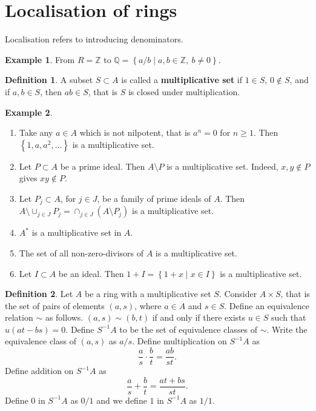 \documentclass{article}
\newcommand{\Z}{\mathbb{Z}}
\newcommand{\Q}{\mathbb{Q}}
\newcommand{\rb}[1]{\left( #1 \right)}
\newcommand{\cb}[1]{\left\{ #1 \right\}}
\theoremstyle{definition}\newtheorem{definition}{Definition}[section]
\theoremstyle{definition}\newtheorem{remark}[definition]{Remark}
\theoremstyle{definition}\newtheorem*{example}{Example}
\theoremstyle{definition}\newtheorem*{note}{Note}
\begin{document}
\section{Localisation of rings}

Localisation refers to introducing denominators.

\begin{example}
From $ R = \Z $ to $ \Q = \cb{a / b \mid a, b \in \Z, \ b \ne 0} $.
\end{example}

\begin{definition}
A subset $ S \subset A $ is called a \textbf{multiplicative set} if $ 1 \in S $, $ 0 \not\in S $, and if $ a, b \in S $, then $ ab \in S $, that is $ S $ is closed under multiplication.
\end{definition}

\begin{example}
\hfill
\begin{enumerate}
\item Take any $ a \in A $ which is not nilpotent, that is $ a^n = 0 $ for $ n \ge 1 $. Then $ \cb{1, a, a^2, \dots} $ is a multiplicative set.
\item Let $ P \subset A $ be a prime ideal. Then $ A \setminus P $ is a multiplicative set. Indeed, $ x, y \notin P $ gives $ xy \notin P $.
\item Let $ P_j \subset A $, for $ j \in J $, be a family of prime ideals of $ A $. Then $ A \setminus \cup_{j \in J} P_j = \cap_{j \in J} \rb{A \setminus P_j} $ is a multiplicative set.
\item $ A^* $ is a multiplicative set in $ A $.
\item The set of all non-zero-divisors of $ A $ is a multiplicative set.
\item Let $ I \subset A $ be an ideal. Then $ 1 + I = \cb{1 + x \mid x \in I} $ is a multiplicative set.
\end{enumerate}
\end{example}

\begin{definition}
Let $ A $ be a ring with a multiplicative set $ S $. Consider $ A \times S $, that is the set of pairs of elements $ \rb{a, s} $, where $ a \in A $ and $ s \in S $. Define an equivalence relation $ \sim $ as follows. $ \rb{a, s} \sim \rb{b, t} $ if and only if there exists $ u \in S $ such that $ u\rb{at - bs} = 0 $. Define $ S^{-1}A $ to be the set of equivalence classes of $ \sim $. Write the equivalence class of $ \rb{a, s} $ as $ a / s $. Define multiplication on $ S^{-1}A $ as
$$ \dfrac{a}{s} \cdot \dfrac{b}{t} = \dfrac{ab}{st}. $$
Define addition on $ S^{-1}A $ as
$$ \dfrac{a}{s} + \dfrac{b}{t} = \dfrac{at + bs}{st}. $$
Define $ 0 $ in $ S^{-1}A $ as $ 0 / 1 $ and we define $ 1 $ in $ S^{-1}A $ as $ 1 / 1 $.
\end{definition}
\end{document}
